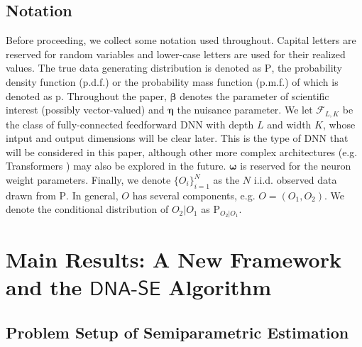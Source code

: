 \documentclass{article}
\def\calF{\mathcal{F}}
\def\dnase{{\mathsf{DNA\mbox{-}SE}}}
\theoremstyle{plain}
\theoremstyle{definition}
\theoremstyle{remark}
\def\P{\mathrm{P}}
\def\bbeta{\boldsymbol{\beta}}
\def\p{\mathrm{p}}
\begin{document}
\subsection*{Notation}

Before proceeding, we collect some notation used throughout. Capital letters are reserved for random variables and lower-case letters are used for their realized values. The true data generating distribution is denoted as $\P$, the probability density function (p.d.f.) or the probability mass function (p.m.f.) of which is denoted as $\p$. %
Throughout the paper, $\bbeta$ denotes the parameter of scientific interest (possibly vector-valued) and $\bm{\eta}$ the nuisance parameter. We let $\calF_{L, K}$ be the class of fully-connected feedforward DNN with depth $L$ and width $K$, whose intput and output dimensions will be clear later. This is the type of DNN that will be considered in this paper, although other more complex architectures (e.g. Transformers \citep{vaswani2017attention}) may also be explored in the future. $\bm{\omega}$ is reserved for the neuron weight parameters. Finally, we denote $\{O_i\}_{i = 1}^N$ as the $N$ i.i.d. observed data drawn from $\P$. In general, $O$ has several components, e.g. $O = (O_1, O_2)$. We denote the conditional distribution of $O_{2} | O_{1}$ as $\P_{O_{2} | O_{1}}$.

\section{Main Results: A New Framework and the  $\dnase$ Algorithm}
\label{sec:algor}

\subsection{Problem Setup of Semiparametric Estimation}
\label{sec:setup}
\end{document}
